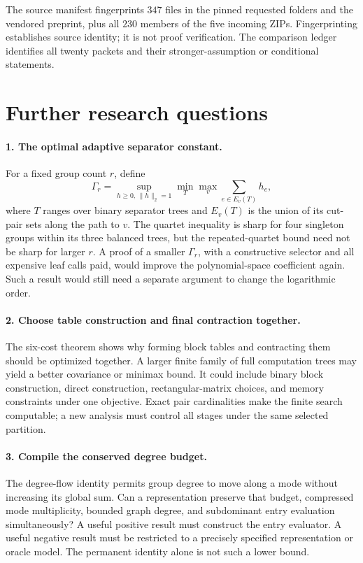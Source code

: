The source manifest fingerprints $347$ files in the pinned requested
folders and the vendored preprint, plus all $230$ members of the five
incoming ZIPs. Fingerprinting establishes source identity; it is not
proof verification. The comparison ledger identifies all twenty
packets and their stronger-assumption or conditional statements.

\section{Further research questions}
\label{sec:further}

\paragraph{1. The optimal adaptive separator constant.}
For a fixed group count $r$, define
\[
 \Gamma_r=\sup_{h\ge0,\,\|h\|_2=1}
             \min_T\max_{v}\sum_{e\in E_v(T)}h_e,
\]
where $T$ ranges over binary separator trees and $E_v(T)$ is the union
of its cut-pair sets along the path to $v$. The quartet inequality is
sharp for four singleton groups within its three balanced trees, but
the repeated-quartet bound need not be sharp for larger $r$. A proof
of a smaller $\Gamma_r$, with a constructive selector and all expensive
leaf calls paid, would improve the polynomial-space coefficient again.
Such a result would still need a separate argument to change the
logarithmic order.

\paragraph{2. Choose table construction and final contraction together.}
The six-cost theorem shows why forming block tables and contracting them
should be optimized together. A larger finite family of full computation
trees may yield a better covariance or minimax bound. It could include
binary block construction, direct construction, rectangular-matrix
choices, and memory constraints under one objective. Exact pair cardinalities
make the finite search computable; a new analysis must control all
stages under the same selected partition.

\paragraph{3. Compile the conserved degree budget.}
The degree-flow identity permits group degree to move along a mode
without increasing its global sum. Can a representation preserve that
budget, compressed mode multiplicity, bounded graph degree, and
subdominant entry evaluation simultaneously? A useful positive result
must construct the entry evaluator. A useful negative result must be
restricted to a precisely specified representation or oracle model.
The permanent identity alone is not such a lower bound.

